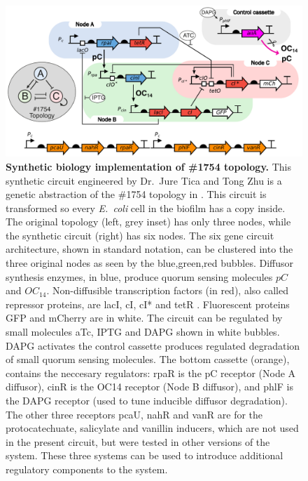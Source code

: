 \begin{figure}[H]
    \centering
    \includegraphics[width=1\textwidth]{chapters/Chapter 2/synthetic circuit2}
    \caption{\textbf{Synthetic biology implementation of \#1754 topology.} This synthetic circuit
    engineered by Dr.~Jure Tica and Tong Zhu is a genetic abstraction of the \#1754 topology in \cite{Scholes2019}.
    This circuit is transformed so every \textit{E.~coli} cell in the biofilm has a copy inside.
    The original topology (left, grey inset) has only three nodes, while the synthetic circuit (right) has six nodes.
    The six gene circuit architecture, shown in standard notation, can be clustered into the three original nodes
    as seen by the blue,green,red bubbles.
    Diffusor synthesis enzymes, in blue, produce quorum sensing molecules $pC$ and $OC_{14}$.
    Non-diffusible transcription
    factors (in red), also called repressor proteins, are lacI, cI, cI* and tetR .
    Fluorescent proteins GFP and mCherry are in white.
    The circuit can be regulated by small molecules aTc, IPTG and DAPG shown in white bubbles.
    DAPG activates the control cassette produces regulated degradation of small quorum sensing molecules.
    The bottom cassette (orange), contains the neccesary regulators:
    rpaR is the pC receptor (Node A diffusor), cinR is the OC14 receptor (Node B diffusor),
        and phlF is the DAPG receptor (used to tune inducible diffusor degradation).
    The other three receptors pcaU, nahR and vanR are for the protocatechuate, salicylate and vanillin inducers,
        which are not used in the present circuit, but were tested in other versions of the system.
    These three systems can be used to introduce additional regulatory components to the system.}
    \label{fig:synthetic circuit_chapter2}
\end{figure}

